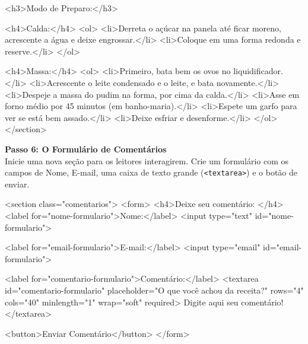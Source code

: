 \documentclass[12pt,a4paper]{article}
\begin{document}
\begin{codehtml}
                    <h3>Modo de Preparo:</h3>

                    <h4>Calda:</h4>
                    <ol>
                        <li>Derreta o açúcar na panela até ficar moreno, acrescente a água e deixe engrossar.</li>
                        <li>Coloque em uma forma redonda e reserve.</li>
                    </ol>

                    <h4>Massa:</h4>
                    <ol>
                        <li>Primeiro, bata bem os ovos no liquidificador.</li>
                        <li>Acrescente o leite condensado e o leite, e bata novamente.</li>
                        <li>Despeje a massa do pudim na forma, por cima da calda.</li>
                        <li>Asse em forno médio por 45 minutos (em banho-maria).</li>
                        <li>Espete um garfo para ver se está bem assado.</li>
                        <li>Deixe esfriar e desenforme.</li>
                    </ol>
                </section>
\end{codehtml}

\noindent\textbf{Passo 6: O Formulário de Comentários}\\
Inicie uma nova seção para os leitores interagirem. Crie um formulário com os campos de Nome, E-mail, uma caixa de texto grande (\verb|<textarea>|) e o botão de enviar.

\begin{codehtml}
                <section class="comentarios">
                    <form>
                        <h4>Deixe seu comentário: </h4>
                        <label for="nome-formulario">Nome:</label>
                        <input type="text" id="nome-formulario">

                        <label for="email-formulario">E-mail:</label>
                        <input type="email" id="email-formulario">

                        <label for="comentario-formulario">Comentário:</label>
                        <textarea
                            id="comentario-formulario"
                            placeholder="O que você achou da receita?"
                            rows="4"
                            cols="40"
                            minlength="1"
                            wrap="soft"
                            required>
                            Digite aqui seu comentário!
                        </textarea>

                        <button>Enviar Comentário</button>
                    </form>
\end{codehtml}
\end{document}
